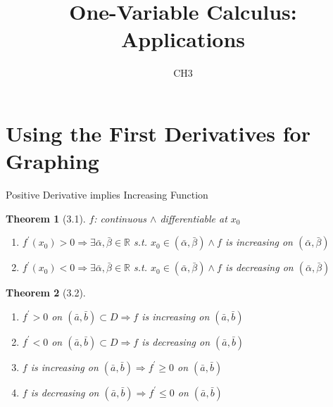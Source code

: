 \documentclass[a4paper,11pt]{article}
\author[조남운]{\mail}
\title{One-Variable Calculus: Applications}
\subtitle{CH3}
\newtheorem{thm}{Theorem}
\begin{document}
	\maketitle


\section{Using the First Derivatives for Graphing} %
\label{sec:using_the_first_derivative_for_graphing}

\begin{frame}[t]{Positive Derivative implies Increasing Function}
	\begin{thm}[3.1]
		$f$: continuous $\land$ differentiable at $x_0$
		\begin{enumerate}
			\item $f^\prime (x_0)>0 \Rightarrow \exists \bar\alpha,\bar\beta\in\mathbb{R} $ s.t. $x_0\in(\bar\alpha,\bar\beta)\land f$ is increasing on $(\bar\alpha,\bar\beta)$
			\item $f^\prime (x_0)<0 \Rightarrow \exists \bar\alpha,\bar\beta\in\mathbb{R} $ s.t. $x_0\in(\bar\alpha,\bar\beta)\land f$ is decreasing on $(\bar\alpha,\bar\beta)$
		\end{enumerate}
	\end{thm}
	\begin{thm}
		[3.2]
		\begin{enumerate}
			\item $f^\prime>0$ on $(\bar a, \bar b)\subset D \Rightarrow f$ is increasing on $(\bar a,\bar b)$
			\item $f^\prime<0$ on $(\bar a, \bar b)\subset D \Rightarrow f$ is decreasing on $(\bar a,\bar b)$
			\item $f$ is increasing on $(\bar a, \bar b) \Rightarrow f^\prime \ge 0$ on $(\bar a, \bar b)$
			\item $f$ is decreasing on $(\bar a, \bar b) \Rightarrow f^\prime \le 0$ on $(\bar a, \bar b)$
		\end{enumerate}
	\end{thm}
\end{frame}
\end{document}

